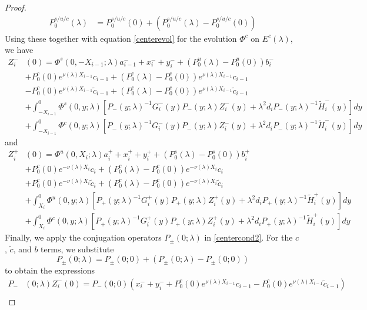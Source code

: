 \documentclass[thesis.tex]{subfiles}
\begin{document}
\begin{lemma}
\begin{proof}
\begin{align*}
P_0^{s/u/c}(\lambda) &= P_0^{s/u/c}(0) + (P_0^{s/u/c}(\lambda) - P_0^{s/u/c}(0)) 
\end{align*}
Using these together with equation \eqref{centerevol} for the evolution $\Phi^c$ on $E^c(\lambda)$, we have
\begin{align*}
Z_i^-&(0) = \Phi^s(0, -X_{i-1}; \lambda) a_{i-1}^- + x_i^- + y_i^- + (P_0^u(\lambda) - P_0^u(0))b_i^- \\
&+ P_0^c(0) e^{\nu(\lambda) X_{i-1}} c_{i-1} + (P_0^c(\lambda) - P_0^c(0)) e^{\nu(\lambda) X_{i-1}} c_{i-1} \\
&- P_0^c(0) e^{\nu(\lambda) X_{i-1}} \tilde{c}_{i-1} + (P_0^c(\lambda) - P_0^c(0)) e^{\nu(\lambda) X_{i-1}} \tilde{c}_{i-1} \\
&+ \int_{-X_{i-1}}^0 \Phi^s(0, y; \lambda) [P_-(y; \lambda)^{-1} G_i^-(y) P_-(y; \lambda)Z_i^-(y) + \lambda^2 d_i P_-(y; \lambda)^{-1} \tilde{H}_i^-(y)] dy \\
&+ \int_{-X_{i-1}}^0 \Phi^c(0, y; \lambda) [P_-(y; \lambda)^{-1} G_i^-(y) P_-(y; \lambda)Z_i^-(y) + \lambda^2 d_i P_-(y; \lambda)^{-1} \tilde{H}_i^-(y)] dy
\end{align*}
and
\begin{align*} 
Z_i^+&(0) = \Phi^u(0, X_i; \lambda) a_i^+ + x_i^+ + y_i^+ + (P_0^s(\lambda) - P_0^s(0)) b_i^+ \\
&+ P_0^c(0) e^{-\nu(\lambda)X_i} c_i + (P_0^c(\lambda) - P_0^c(0)) e^{-\nu(\lambda)X_i} c_i \\
&+ P_0^c(0) e^{-\nu(\lambda)X_i} \tilde{c}_i + (P_0^c(\lambda) - P_0^c(0)) e^{-\nu(\lambda)X_i} \tilde{c}_i \\
&+ \int_{X_i}^0 \Phi^u(0, y; \lambda) [P_+(y; \lambda)^{-1} G_i^+(y) P_+(y; \lambda) Z_i^+(y) + \lambda^2 d_i P_+(y; \lambda)^{-1} \tilde{H}_i^+(y)] dy \\
&+ \int_{X_i}^0 \Phi^c(0, y; \lambda) [P_+(y; \lambda)^{-1} G_i^+(y) P_+(y; \lambda) Z_i^+(y) + \lambda^2 d_i P_+(y; \lambda)^{-1} \tilde{H}_i^+(y)] dy 
\end{align*}
Finally, we apply the conjugation operators $P_\pm(0; \lambda)$ in \eqref{centercond2}. For the $c$, $\tilde{c}$, and $b$ terms, we substitute
\[
P_\pm(0; \lambda) = P_\pm(0; 0) + (P_\pm(0; \lambda) - P_\pm(0; 0))
\]
to obtain the expressions
\begin{align*}
P_-&(0; \lambda) Z_i^-(0) = P_-(0; 0)( x_i^- + y_i^- + P_0^c(0) e^{\nu(\lambda) X_{i-1}} c_{i-1} - P_0^c(0) e^{\nu(\lambda) X_{i-1}} \tilde{c}_{i-1} ) \\

\end{align*}
\end{proof}
\end{lemma}
\end{document}
